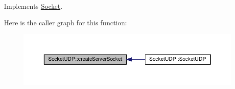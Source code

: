Implements \hyperlink{class_socket_a3376aae78f0c696c3787e4f04ed7f680}{Socket}.



Here is the caller graph for this function\-:
\nopagebreak
\begin{figure}[H]
\begin{center}
\leavevmode
\includegraphics[width=350pt]{class_socket_u_d_p_aeac93900205bb3c08a90008dfda3585b_icgraph}
\end{center}
\end{figure}


